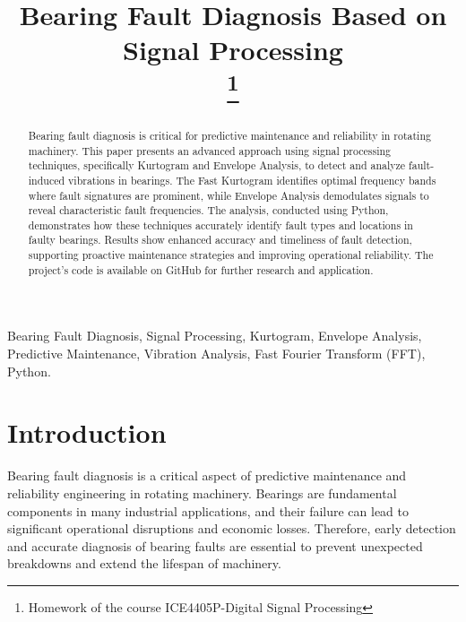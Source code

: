 \documentclass[conference]{IEEEtran}
\begin{document}
\title{Bearing Fault Diagnosis Based on Signal Processing\\
\thanks{Homework of the course ICE4405P-Digital Signal Processing}
}

\author{
\and
{}
}

\maketitle

\begin{abstract}
Bearing fault diagnosis is critical for predictive maintenance and reliability in rotating machinery. This paper presents an advanced approach using signal processing techniques, specifically Kurtogram and Envelope Analysis, to detect and analyze fault-induced vibrations in bearings. The Fast Kurtogram identifies optimal frequency bands where fault signatures are prominent, while Envelope Analysis demodulates signals to reveal characteristic fault frequencies. The analysis, conducted using Python, demonstrates how these techniques accurately identify fault types and locations in faulty bearings. Results show enhanced accuracy and timeliness of fault detection, supporting proactive maintenance strategies and improving operational reliability. The project's code is available on GitHub for further research and application.
\end{abstract}

\begin{IEEEkeywords}
Bearing Fault Diagnosis, Signal Processing, Kurtogram, Envelope Analysis, Predictive Maintenance, Vibration Analysis, Fast Fourier Transform (FFT), Python.
\end{IEEEkeywords}

\section{Introduction}

Bearing fault diagnosis is a critical aspect of predictive maintenance and reliability engineering in rotating machinery. Bearings are fundamental components in many industrial applications, and their failure can lead to significant operational disruptions and economic losses. Therefore, early detection and accurate diagnosis of bearing faults are essential to prevent unexpected breakdowns and extend the lifespan of machinery.
\end{document}

